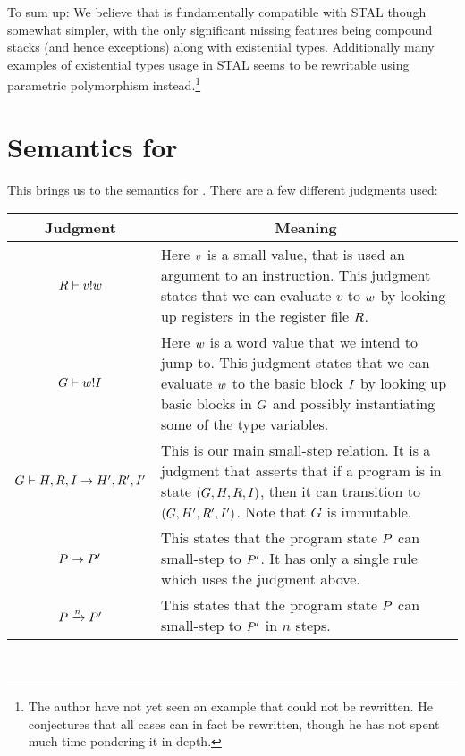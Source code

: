 To sum up: We believe that \ATAL is fundamentally compatible with STAL though
somewhat simpler, with the only significant missing features being compound
stacks (and hence exceptions) along with existential types. Additionally many
examples of existential types usage in STAL seems to be rewritable using
parametric polymorphism instead.\footnote{The author have not yet seen an
  example that could not be rewritten. He conjectures that all cases can in fact
  be rewritten, though he has not spent much time pondering it in depth.}

\section{Semantics for \ATAL}

This brings us to the semantics for \ATAL. There are a few different judgments
used:

\begin{tabular}{|c|p{7.5 cm}|}
  \hline
  Judgment & \multicolumn{1}{|c|}{Meaning} \\\hline
  ${R} |- {v} ! {w}$ & Here $v$ is a small value, that is used an argument to an instruction. This judgment states that we can evaluate $v$ to $w$ by looking up registers in the register file $R$. \\\hline
  ${G} |- {w} ! {I}$ & Here $w$ is a word value that we intend to jump to. This judgment states that we can evaluate $w$ to the basic block $I$ by looking up basic blocks in $G$ and possibly instantiating some of the type variables. \\\hline
  ${G} |- {H, R, I} -> {H', R', I'}$ & This is our main small-step relation. It is a judgment that asserts that if a program is in state $(G, H, R, I)$, then it can transition to $(G, H', R', I')$. Note that $G$ is immutable. \\\hline
  ${P} -> {P'}$ & This states that the program state $P$ can small-step to $P'$. It has only a single rule which uses the judgment above. \\\hline
  ${P} \xrightarrow{n} {P'}$ & This states that the program state $P$ can small-step to $P'$ in $n$ steps. \\\hline
\end{tabular} \\

